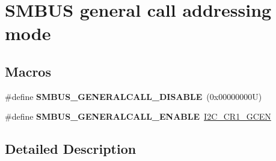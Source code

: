 \hypertarget{group___s_m_b_u_s__general__call__addressing__mode}{}\section{S\+M\+B\+US general call addressing mode}
\label{group___s_m_b_u_s__general__call__addressing__mode}
\subsection*{Macros}
\begin{DoxyCompactItemize}
\item 
\mbox{\label{group___s_m_b_u_s__general__call__addressing__mode_gacf546a6d09ae3e6305165bdb19cccf13}} 
\#define {\bfseries S\+M\+B\+U\+S\+\_\+\+G\+E\+N\+E\+R\+A\+L\+C\+A\+L\+L\+\_\+\+D\+I\+S\+A\+B\+LE}~(0x00000000\+U)
\item 
\mbox{\label{group___s_m_b_u_s__general__call__addressing__mode_gae5ff222f461e5341f341844e6ece7d88}} 
\#define {\bfseries S\+M\+B\+U\+S\+\_\+\+G\+E\+N\+E\+R\+A\+L\+C\+A\+L\+L\+\_\+\+E\+N\+A\+B\+LE}~\hyperlink{group___peripheral___registers___bits___definition_gac28d4f433e501e727c91097dccc4616c}{I2\+C\+\_\+\+C\+R1\+\_\+\+G\+C\+EN}
\end{DoxyCompactItemize}


\subsection{Detailed Description}
